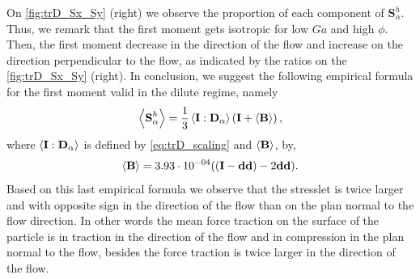 On \ref{fig:trD_Sx_Sy} (right) we observe the proportion of each component of $\textbf{S}_\alpha^h$. 
Thus, we remark that the first moment gets isotropic for low $Ga$ and high $\phi$.
Then, the first moment decrease in the direction of the flow and increase on the direction perpendicular to the flow, as indicated by the ratios on the \ref{fig:trD_Sx_Sy} (right).
In conclusion, we suggest the following empirical formula for the first moment valid in the dilute regime, namely
\begin{equation}
    \left<\textbf{S}^h_\alpha\right>
    =\frac{1}{3} \left<\textbf{I}:\textbf{D}_\alpha\right>
    \left(
        \textbf{I} 
        + \left<\textbf{B}\right>
    \right),
\end{equation}
where $\left<\textbf{I}:\textbf{D}_\alpha\right>$ is defined by \ref{eq:trD_scaling} and $\left<\textbf{B}\right>$, by,
\begin{equation}
    \left<\textbf{B}\right> = 3.93 \cdot 10^{-04} ((\textbf{I}-\textbf{dd})-2\textbf{dd}).
    \label{eq:B_scaling}
\end{equation}
Based on this last empirical formula we observe that the stresslet is twice larger and with opposite sign in the direction of the flow than on the plan normal to the flow direction. 
In other words the mean force traction on the surface of the particle is in traction in the direction of the flow and in compression in the plan normal to the flow, besides the force traction is twice larger in the direction of the flow. 